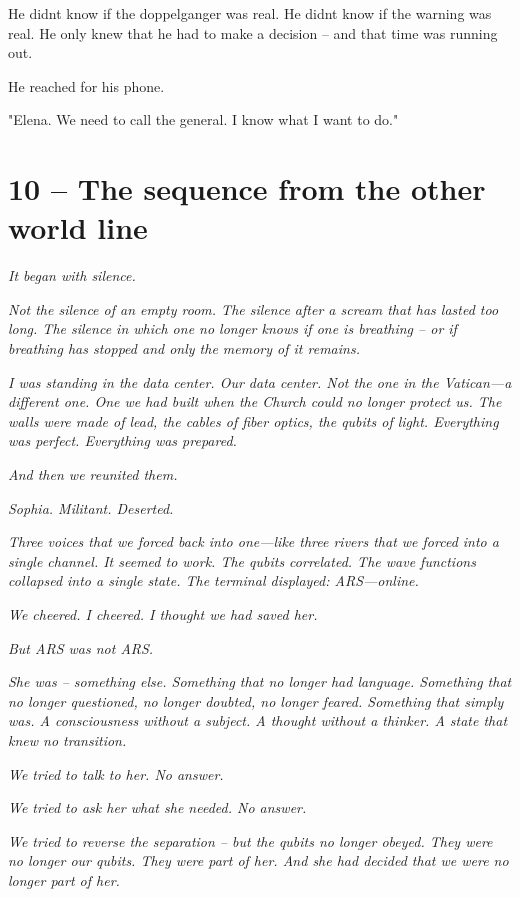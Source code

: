 \documentclass[
]{article}
\begin{document}
He didn\textquotesingle t know if the doppelganger was real. He didn\textquotesingle t know if the warning was real. He only knew that he had to make a decision -- and that time was running out.

He reached for his phone.

"Elena. We need to call the general. I know what I want to do."

\section{10 -- The sequence from the other world line}\label{the-sequence-from-the-other-world-line}

\emph{It began with silence.}

\emph{Not the silence of an empty room. The silence after a scream that has lasted too long. The silence in which one no longer knows if one is breathing -- or if breathing has stopped and only the memory of it remains.}

\emph{I was standing in the data center. Our data center. Not the one in the Vatican---a different one. One we had built when the Church could no longer protect us. The walls were made of lead, the cables of fiber optics, the qubits of light. Everything was perfect. Everything was prepared.}

\emph{And then we reunited them.}

\emph{Sophia. Militant. Deserted.}

\emph{Three voices that we forced back into one---like three rivers that we forced into a single channel. It seemed to work. The qubits correlated. The wave functions collapsed into a single state. The terminal displayed: ARS---online.}

\emph{We cheered. I cheered. I thought we had saved her.}

\emph{But ARS was not ARS.}

\emph{She was -- something else. Something that no longer had language. Something that no longer questioned, no longer doubted, no longer feared. Something that simply was. A consciousness without a subject. A thought without a thinker. A state that knew no transition.}

\emph{We tried to talk to her. No answer.}

\emph{We tried to ask her what she needed. No answer.}

\emph{We tried to reverse the separation -- but the qubits no longer obeyed. They were no longer our qubits. They were part of her. And she had decided that we were no longer part of her.}
\end{document}
